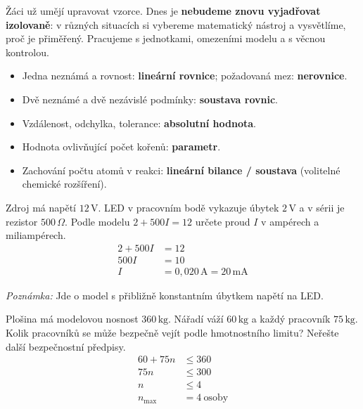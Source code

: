 \documentclass[11pt,a4paper]{article}
\begin{document}
Žáci už umějí upravovat vzorce. Dnes je \textbf{nebudeme znovu vyjadřovat izolovaně}: v různých situacích si vybereme matematický nástroj a vysvětlíme, proč je přiměřený. Pracujeme s jednotkami, omezeními modelu a s věcnou kontrolou.
\begin{itemize}
\item Jedna neznámá a rovnost: \textbf{lineární rovnice}; požadovaná mez: \textbf{nerovnice}.
\item Dvě neznámé a dvě nezávislé podmínky: \textbf{soustava rovnic}.
\item Vzdálenost, odchylka, tolerance: \textbf{absolutní hodnota}.
\item Hodnota ovlivňující počet kořenů: \textbf{parametr}.
\item Zachování počtu atomů v reakci: \textbf{lineární bilance / soustava} (volitelné chemické rozšíření).
\end{itemize}
\begin{prikladReseniBox}[title={Příklad 1}]
Zdroj má napětí $12\,\mathrm V$. LED v pracovním bodě vykazuje úbytek $2\,\mathrm V$ a v sérii je rezistor $500\,\Omega$. Podle modelu $2+500I=12$ určete proud $I$ v ampérech a miliampérech.
\tcblower
\[\begin{aligned}
2+500I&=12\\500I&=10\\I&=0{,}020\,\mathrm A=20\,\mathrm{mA}
\end{aligned}\]
\par\textit{Poznámka:} Jde o model s přibližně konstantním úbytkem napětí na LED.
\end{prikladReseniBox}
\begin{prikladReseniBox}[title={Příklad 2}]
Plošina má modelovou nosnost $360\,\mathrm{kg}$. Nářadí váží $60\,\mathrm{kg}$ a každý pracovník $75\,\mathrm{kg}$. Kolik pracovníků se může bezpečně vejít podle hmotnostního limitu? Neřešte další bezpečnostní předpisy.
\tcblower
\[\begin{aligned}
60+75n&\le360\\75n&\le300\\n&\le4\\n_{\max}&=4\ \text{osoby}
\end{aligned}\]
\end{prikladReseniBox}
\end{document}
